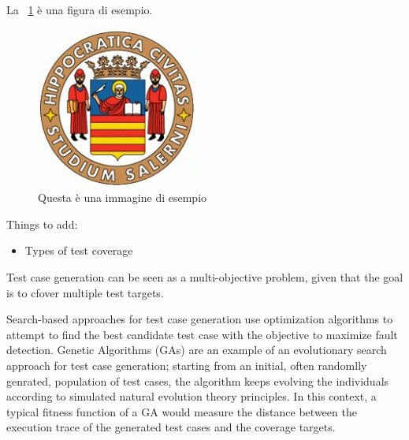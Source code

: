 La \figurename~\ref{fig:esempio} è una figura di esempio.

\begin{figure}[htbp]
    \centering
    \includegraphics[scale=0.7]{./figures/logo_standard.jpg}
    \caption{Questa è una immagine di esempio}
    \label{fig:esempio}
\end{figure}


Things to add:
\begin{itemize}
    \item Types of test coverage
\end{itemize}



Test case generation can be seen as a multi-objective problem, given that the goal is to cfover multiple test targets.

Search-based approaches for test case generation use optimization algorithms to attempt to find 
the best candidate test case with the objective to maximize fault detection. Genetic Algorithms (GAs) are an example of an
evolutionary search approach for test case generation; starting from an initial, often randomlly genrated, population of 
test cases, the algorithm keeps evolving the individuals according to simulated natural evolution theory principles.
In this context, a typical fitness function of a GA would measure the distance between the execution trace of the generated test cases
and the coverage targets.